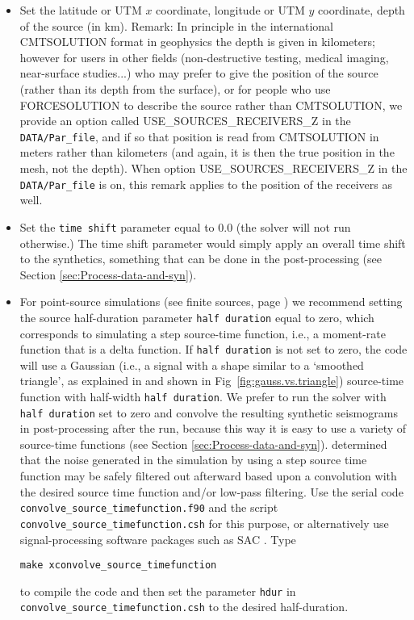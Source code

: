 \begin{itemize}
\item Set the latitude or UTM $x$ coordinate, longitude or UTM $y$ coordinate, depth of the source (in km). Remark: In principle in the international CMTSOLUTION format in geophysics
the depth is given in kilometers; however for users in other fields (non-destructive testing, medical imaging, near-surface studies...) who may prefer to give the position of the source (rather than its depth from the surface), or for people who use FORCESOLUTION to describe the source rather than CMTSOLUTION, we provide an option called USE\_SOURCES\_RECEIVERS\_Z in the \texttt{DATA/Par\_file}, and if so that position is read from CMTSOLUTION in meters rather than kilometers (and again, it is then the true position in the mesh, not the depth). When option USE\_SOURCES\_RECEIVERS\_Z in the \texttt{DATA/Par\_file} is on, this remark applies to the position of the receivers as well.
\item Set the \texttt{time shift} parameter equal to $0.0$ (the solver
will not run otherwise.) The time shift parameter would simply apply
an overall time shift to the synthetics, something that can be done
in the post-processing (see Section \ref{sec:Process-data-and-syn}).
\item For point-source simulations (see finite sources, page \pageref{To-simulate-a})
we recommend setting the source half-duration parameter \texttt{half
duration} equal to zero, which corresponds to simulating a step source-time
function, i.e., a moment-rate function that is a delta function. If
\texttt{half duration} is not set to zero, the code will use a Gaussian
(i.e., a signal with a shape similar to a `smoothed triangle', as
explained in \citet{KoTr02a} and shown in Fig~\ref{fig:gauss.vs.triangle})
source-time function with half-width \texttt{half duration}. We prefer
to run the solver with \texttt{half duration} set to zero and convolve
the resulting synthetic seismograms in post-processing after the run,
because this way it is easy to use a variety of source-time functions
(see Section \ref{sec:Process-data-and-syn}). \citet{KoTr02a} determined
that the noise generated in the simulation by using a step source
time function may be safely filtered out afterward based upon a convolution
with the desired source time function and/or low-pass filtering. Use
the serial code \texttt{convolve\_source\_timefunction.f90} and the
script \texttt{convolve\_source\_timefunction.csh} for this purpose,
or alternatively use signal-processing software packages such as SAC
. Type
{\small
\begin{verbatim}
make xconvolve_source_timefunction
\end{verbatim}
}
to compile the code and then set the parameter \texttt{hdur} in \texttt{convolve\_source\_timefunction.csh}
to the desired half-duration.


\end{itemize}
